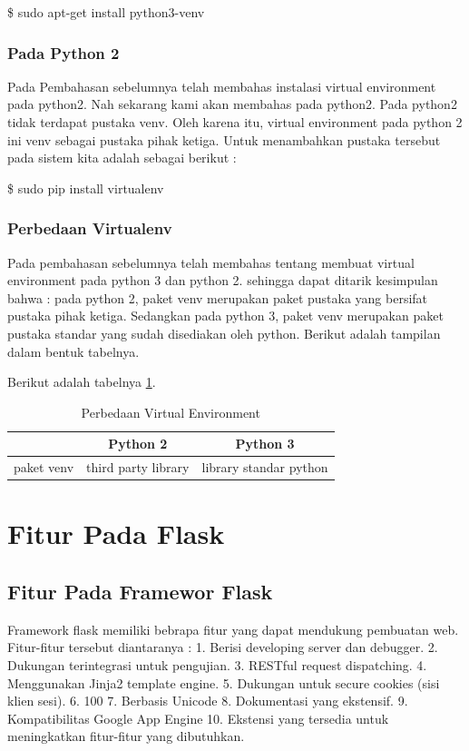 \documentclass[12pt,a4paper]{article}
\begin{document}
\$ sudo apt-get install python3-venv
\subsubsection{Pada Python 2}
Pada Pembahasan sebelumnya telah membahas instalasi virtual environment pada python2. Nah sekarang kami akan membahas pada python2. Pada python2 tidak terdapat pustaka venv. Oleh karena itu, virtual environment pada python 2 ini venv sebagai pustaka pihak ketiga.
Untuk menambahkan pustaka tersebut pada sistem kita adalah sebagai berikut :

\$ sudo pip install virtualenv
\subsubsection{Perbedaan Virtualenv}
Pada pembahasan sebelumnya telah membahas tentang membuat virtual environment pada python 3 dan python 2. sehingga dapat ditarik kesimpulan bahwa :
pada python 2, paket venv merupakan paket pustaka yang bersifat pustaka pihak ketiga. Sedangkan pada python 3, paket venv merupakan paket pustaka standar yang sudah disediakan oleh python.
Berikut adalah tampilan dalam bentuk tabelnya.

Berikut adalah tabelnya \ref{table:perbedaan1}.
\begin{table}[h]
\caption{Perbedaan Virtual Environment}

\centering
\begin{tabular}{ccc}
\hline
&Python 2&Python 3\\
\hline
paket venv&third party library&library standar python\\
\hline
\end{tabular}
\label{table:perbedaan1}
\end{table}


\section{Fitur Pada Flask}
\subsection{Fitur Pada Framewor Flask}
Framework flask memiliki bebrapa fitur yang dapat mendukung pembuatan web. Fitur-fitur tersebut diantaranya : 
1.	Berisi developing server dan debugger.
2.	Dukungan terintegrasi untuk pengujian.
3.	RESTful request dispatching.
4.	Menggunakan Jinja2 template engine.
5.	Dukungan untuk secure cookies (sisi klien sesi).
6.	100%
7.	Berbasis Unicode
8.	Dokumentasi yang ekstensif.
9.	Kompatibilitas Google App Engine
10.	Ekstensi yang tersedia untuk meningkatkan fitur-fitur yang dibutuhkan.
\end{document}
